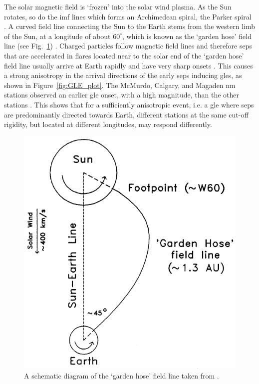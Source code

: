 The solar magnetic field is `frozen' into the solar wind plasma. As the Sun rotates, so do the \gls{imf} lines which forms an Archimedean spiral, the Parker spiral \citep{parker_dynamics_1958, parker_spiral_1976}. A curved field line connecting the Sun to the Earth stems from the western limb of the Sun, at a longitude of about $60^{\circ}$, which is known as the `garden hose' field line (see Fig.~\ref{fig:garden_hose}) \citep{duldig_ground_1993, hathaway_solar_2015}. Charged particles follow magnetic field lines and therefore \glspl{sep} that are accelerated in flares located near to the solar end of the `garden hose' field line usually arrive at Earth rapidly and have very sharp onsets \citep{duldig_ground_1993, andriopoulou_intense_2011}. This causes a strong anisotropy in the arrival directions of the early \glspl{sep} inducing \glspl{gle}, as shown in Figure~\ref{fig:GLE_plot}. The McMurdo, Calgary, and Magaden \gls{nm} stations observed an earlier \gls{gle} onset, with a high magnitude, than the other stations \citep{duldig_ground_1993, cramp_j._l._october_1997}. This shows that for a sufficiently anisotropic event, i.e. a \gls{gle} where \glspl{sep} are predominantly directed towards Earth, different stations at the same cut-off rigidity, but located at different longitudes, may respond differently.

\begin{figure}[ht!]
	\centering
	\includegraphics[width=0.75\columnwidth]{garden_hose.png}
	\caption{A schematic diagram of the `garden hose' field line taken from \cite{duldig_ground_1993}.}
	\label{fig:garden_hose}
\end{figure}

